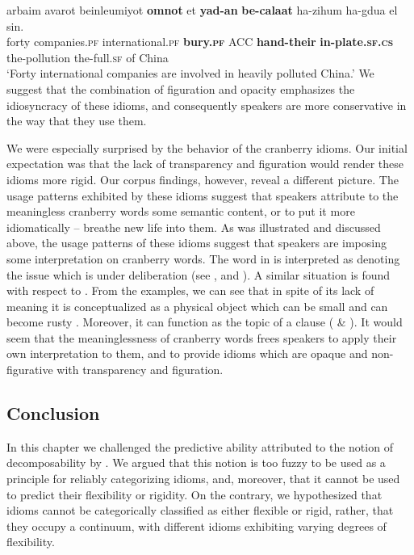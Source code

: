 \documentclass[output=paper]{langsci/langscibook}
\begin{document}
	\ea\label{taman-wrong}
    	\gll {\alef}arba{\ayin}im {\het}avarot beinle{\alef}umiyot \textbf{{\tet}omnot} {\alef}et \textbf{yad-an} \textbf{be-cala{\het}at} ha-zihum ha-gdu{\shin}a {\shin}el sin.\\
    	   forty companies.\textsc{pf} international.\textsc{pf} \textbf{bury.\textsc{pf}} ACC \textbf{hand-their} \textbf{in-plate.\textsc{sf.cs}} the-pollution the-full.\textsc{sf} of China\\
    	\glt `Forty  international companies are involved in heavily polluted China.'
	\z
We suggest that the combination of figuration and opacity emphasizes the idiosyncracy of these idioms, and consequently speakers are more conservative in the way that they use them.

We were especially surprised by the behavior of the cranberry idioms. Our initial expectation was that the lack of transparency and figuration would render these idioms more rigid. Our corpus findings, however, reveal a different picture. The usage patterns exhibited by these idioms suggest that speakers attribute to the meaningless cranberry words some semantic content, or to put it more idiomatically -- breathe new life into them. As was illustrated and discussed above, the usage patterns of these idioms suggest that speakers are imposing some interpretation on cranberry words. The word  in  is interpreted as denoting the issue which is under deliberation (see ,  and ). A similar situation is found with respect to . From the examples, we can see that in spite of its lack of meaning it is conceptualized as a physical object which can be small  and can become rusty . Moreover, it can function as the topic of a clause ( \& ). It would seem that the meaninglessness of cranberry words frees speakers to apply their own interpretation  to them, and to provide idioms which are opaque and non-figurative with transparency and figuration.




\subsection{Conclusion}


In this chapter we challenged the predictive ability attributed to the notion of decomposability by \citet{nunberg94}. We argued that this notion is too fuzzy to be used as a principle for reliably categorizing idioms, and, moreover, that it cannot be used to predict their flexibility or rigidity. On the contrary, we hypothesized that idioms cannot be categorically classified as either flexible or rigid, rather, that they occupy a continuum, with different idioms exhibiting varying degrees of flexibility.
\end{document}
